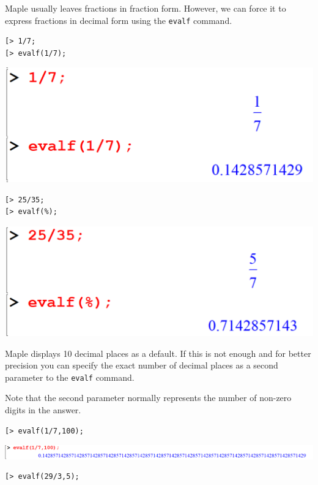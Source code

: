 \documentclass[
]{book}
\theoremstyle{definition}
\theoremstyle{definition}
\theoremstyle{definition}
\theoremstyle{definition}
\theoremstyle{remark}
\begin{document}
Maple usually leaves fractions in fraction form. However, we can force it to express fractions in decimal form using the \texttt{evalf} command.

\begin{verbatim}
[> 1/7;
[> evalf(1/7);
\end{verbatim}

\includegraphics{figures/Lesson 1/fig34.png}

\begin{verbatim}
[> 25/35;
[> evalf(%);
\end{verbatim}

\includegraphics{figures/Lesson 1/fig35.png}

Maple displays 10 decimal places as a default. If this is not enough and for better precision you can specify the exact number of decimal places as a second parameter to the \texttt{evalf} command.

Note that the second parameter normally represents the number of non-zero digits in the answer.

\begin{verbatim}
[> evalf(1/7,100);
\end{verbatim}

\includegraphics{figures/Lesson 1/fig36.png}

\begin{verbatim}
[> evalf(29/3,5);
\end{verbatim}
\end{document}
